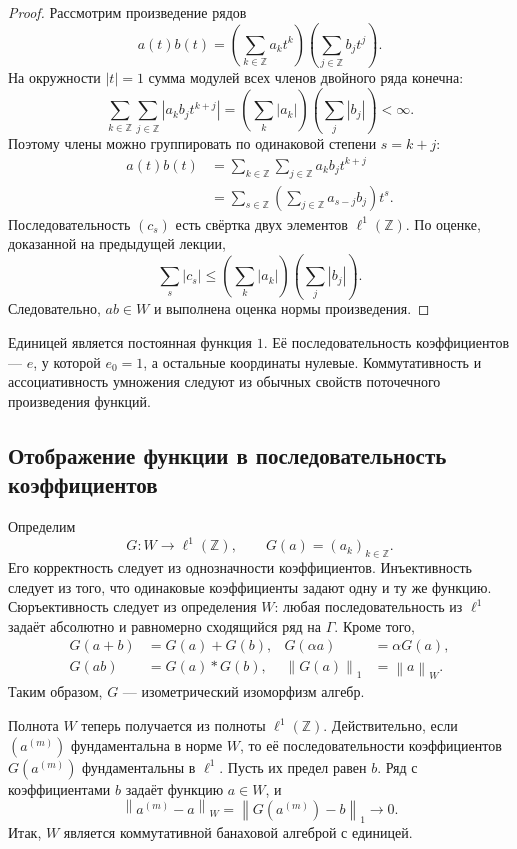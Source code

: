 \documentclass[12pt,a4paper]{article}
\theoremstyle{definition}
\theoremstyle{remark}
\newcommand{\ZZ}{\mathbb{Z}}
\newcommand{\norm}[1]{\left\lVert #1\right\rVert}
\begin{document}
\begin{proof}
Рассмотрим произведение рядов
\[
  a(t)b(t)=\left(\sum_{k\in\ZZ}a_kt^k\right)
          \left(\sum_{j\in\ZZ}b_jt^j\right).
\]
На окружности $|t|=1$ сумма модулей всех членов двойного ряда конечна:
\[
  \sum_{k\in\ZZ}\sum_{j\in\ZZ}|a_kb_jt^{k+j}|
  =\left(\sum_k|a_k|\right)\left(\sum_j|b_j|\right)<\infty.
\]
Поэтому члены можно группировать по одинаковой степени $s=k+j$:
\begin{align*}
  a(t)b(t)
  &=\sum_{k\in\ZZ}\sum_{j\in\ZZ}a_kb_jt^{k+j}\\
  &=\sum_{s\in\ZZ}\left(\sum_{j\in\ZZ}a_{s-j}b_j\right)t^s.
\end{align*}
Последовательность $(c_s)$ есть свёртка двух элементов $\ell^1(\ZZ)$.
По оценке, доказанной на предыдущей лекции,
\[
  \sum_s|c_s|\leqslant\left(\sum_k|a_k|\right)
                           \left(\sum_j|b_j|\right).
\]
Следовательно, $ab\in W$ и выполнена оценка нормы произведения.
\end{proof}

Единицей является постоянная функция $1$. Её последовательность
коэффициентов --- $e$, у которой $e_0=1$, а остальные координаты нулевые.
Коммутативность и ассоциативность умножения следуют из обычных свойств
поточечного произведения функций.

\subsection{Отображение функции в последовательность коэффициентов}

Определим
\[
  G\colon W\longrightarrow\ell^1(\ZZ),\qquad
  G(a)=(a_k)_{k\in\ZZ}.
\]
Его корректность следует из однозначности коэффициентов.
Инъективность следует из того, что одинаковые коэффициенты задают
одну и ту же функцию.
Сюръективность следует из определения $W$: любая последовательность
из $\ell^1$ задаёт абсолютно и равномерно сходящийся ряд на $\Gamma$.
Кроме того,
\begin{align*}
  G(a+b)&=G(a)+G(b),&G(\alpha a)&=\alpha G(a),\\
  G(ab)&=G(a)*G(b),&\norm{G(a)}_1&=\norm{a}_W.
\end{align*}
Таким образом, $G$ --- изометрический изоморфизм алгебр.

Полнота $W$ теперь получается из полноты $\ell^1(\ZZ)$. Действительно,
если $(a^{(m)})$ фундаментальна в норме $W$, то её последовательности
коэффициентов $G(a^{(m)})$ фундаментальны в $\ell^1$. Пусть их предел
равен $b$. Ряд с коэффициентами $b$ задаёт функцию $a\in W$, и
\[
  \norm{a^{(m)}-a}_W=\norm{G(a^{(m)})-b}_1\longrightarrow0.
\]
Итак, $W$ является коммутативной банаховой алгеброй с единицей.
\end{document}
